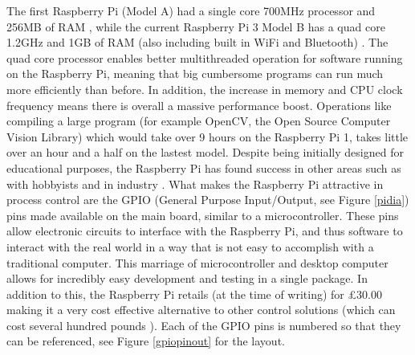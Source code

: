 \documentclass[a4]{report}
\begin{document}
	The first Raspberry Pi (Model A) had a single core 700MHz processor and 256MB of RAM \cite{pi1info}, while the current Raspberry Pi 3 Model B has a quad core 1.2GHz and 1GB of RAM (also including built in WiFi and Bluetooth) \cite{pi3info}. The quad core processor enables better multithreaded operation for software running on the Raspberry Pi, meaning that big cumbersome programs can run much more efficiently than before. In addition, the increase in memory and CPU clock frequency means there is overall a massive performance boost. Operations like compiling a large program (for example OpenCV, the Open Source Computer Vision Library) which would take over 9 hours \cite{pipowercompold} on the Raspberry Pi 1, takes little over an hour and a half \cite{pipowercompnew} on the lastest model.\newline \newline  \noindent
	Despite being initially designed for educational purposes, the Raspberry Pi has found success in other areas such as with hobbyists \cite{pihobbynotedu} and in industry \cite{pimorethanedu}. What makes the Raspberry Pi attractive in process control are the GPIO (General Purpose Input/Output, see Figure \ref{pidia}) pins made available on the main board, similar to a microcontroller. These pins allow electronic circuits to interface with the Raspberry Pi, and thus software to interact with the real world in a way that is not easy to accomplish with a traditional computer. This marriage of microcontroller and desktop computer allows for incredibly easy development and testing in a single package. In addition to this, the Raspberry Pi retails (at the time of writing) for \pounds 30.00 \cite{picost} making it a very cost effective alternative to other control solutions (which can cost several hundred pounds \cite{otherpcucost}). Each of the GPIO pins is numbered so that they can be referenced, see Figure \ref{gpiopinout} for the layout.\newline
\end{document}
